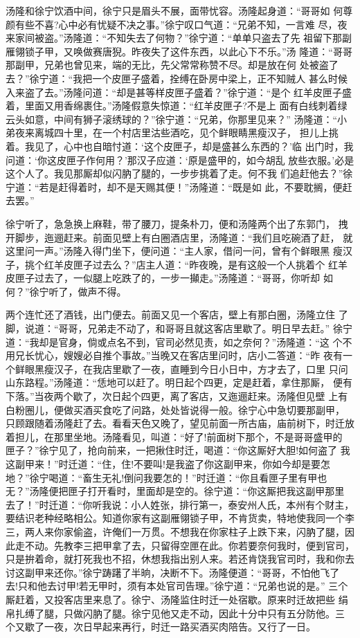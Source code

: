 汤隆和徐宁饮酒中间，徐宁只是眉头不展，面带忧容。汤隆起身道：“哥哥如
何尊颜有些不喜?心中必有忧疑不决之事。”徐宁叹口气道：“兄弟不知，一言难
尽，夜来家间被盗。”汤隆道：“不知失去了何物？”徐宁道：“单单只盗去了先
祖留下那副雁翎锁子甲，又唤做赛唐猊。昨夜失了这件东西，以此心下不乐。”汤
隆道：“哥哥那副甲，兄弟也曾见来，端的无比，先父常常称赞不尽。却是放在何
处被盗了去？”徐宁道：“我把一个皮匣子盛着，拴缚在卧房中梁上，正不知贼人
甚么时候入来盗了去。”汤隆问道：“却是甚等样皮匣子盛着？”徐宁道：“是个
红羊皮匣子盛着，里面又用香绵裹住。”汤隆假意失惊道：“红羊皮匣子?不是上
面有白线刺着绿云头如意，中间有狮子滚绣球的？”徐宁道：“兄弟，你那里见来？”
汤隆道：“小弟夜来离城四十里，在一个村店里沽些酒吃，见个鲜眼睛黑瘦汉子，
担儿上挑着。我见了，心中也自暗忖道：‘这个皮匣子，却是盛甚么东西的？’临
出门时，我问道：‘你这皮匣子作何用？’那汉子应道：‘原是盛甲的，如今胡乱
放些衣服。’必是这个人了。我见那厮却似闪肭了腿的，一步步挑着了走。何不我
们追赶他去？”徐宁道：“若是赶得着时，却不是天赐其便！”汤隆道：“既是如
此，不要耽搁，便赶去罢。”

徐宁听了，急急换上麻鞋，带了腰刀，提条朴刀，便和汤隆两个出了东郭门，
拽开脚步，迤逦赶来。前面见壁上有白圈酒店里，汤隆道：“我们且吃碗酒了赶，
就这里问一声。”汤隆入得门坐下，便问道：“主人家，借问一问，曾有个鲜眼黑
瘦汉子，挑个红羊皮匣子过去么？”店主人道：“昨夜晚，是有这般一个人挑着个
红羊皮匣子过去了，一似腿上吃跌了的，一步一攧走。”汤隆道：“哥哥，你听却
如何？”徐宁听了，做声不得。

两个连忙还了酒钱，出门便去。前面又见一个客店，壁上有那白圈，汤隆立住
了脚，说道：“哥哥，兄弟走不动了，和哥哥且就这客店里歇了。明日早去赶。”
徐宁道：“我却是官身，倘或点名不到，官司必然见责，如之奈何？”汤隆道：“这
个不用兄长忧心，嫂嫂必自推个事故。”当晚又在客店里问时，店小二答道：“昨
夜有一个鲜眼黑瘦汉子，在我店里歇了一夜，直睡到今日小日中，方才去了，口里
只问山东路程。”汤隆道：“恁地可以赶了。明日起个四更，定是赶着，拿住那厮，
便有下落。”当夜两个歇了，次日起个四更，离了客店，又迤逦赶来。汤隆但见壁
上有白粉圈儿，便做买酒买食吃了问路，处处皆说得一般。徐宁心中急切要那副甲，
只顾跟随着汤隆赶了去。看看天色又晚了，望见前面一所古庙，庙前树下，时迁放
着担儿，在那里坐地。汤隆看见，叫道：“好了!前面树下那个，不是哥哥盛甲的
匣子？”徐宁见了，抢向前来，一把揪住时迁，喝道：“你这厮好大胆!如何盗了
我这副甲来！”时迁道：“住，住!不要叫!是我盗了你这副甲来，你如今却是要怎
地？”徐宁喝道：“畜生无礼!倒问我要怎的！”时迁道：“你且看匣子里有甲也
无？”汤隆便把匣子打开看时，里面却是空的。徐宁道：“你这厮把我这副甲那里
去了！”时迁道：“你听我说：小人姓张，排行第一，泰安州人氏，本州有个财主，
要结识老种经略相公。知道你家有这副雁翎锁子甲，不肯货卖，特地使我同一个李
三，两人来你家偷盗，许俺们一万贯。不想我在你家柱子上跌下来，闪肭了腿，因
此走不动。先教李三把甲拿了去，只留得空匣在此。你若要奈何我时，便到官司，
只是拚着命，就打死我也不招，休想我指出别人来。若还肯饶我官司时，我和你去
讨这副甲来还你。”徐宁踌躇了半晌，决断不下。汤隆便道：“哥哥，不怕他飞了
去!只和他去讨甲!若无甲时，须有本处官司告理。”徐宁道：“兄弟也说的是。”
三个厮赶着，又投客店里来息了。徐宁、汤隆监住时迁一处宿歇。原来时迁故把些
绢帛扎缚了腿，只做闪肭了腿。徐宁见他又走不动，因此十分中只有五分防他。三
个又歇了一夜，次日早起来再行，时迁一路买酒买肉陪告。又行了一日。

